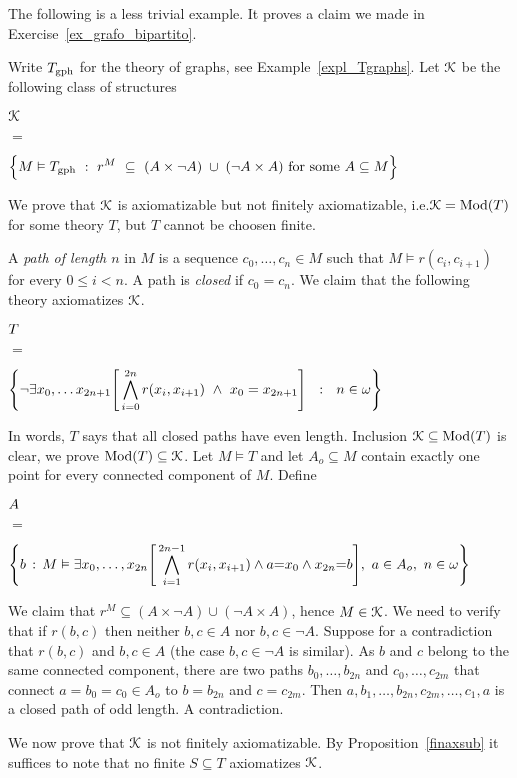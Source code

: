 \documentclass[creche.tex]{subfiles}
\begin{document}
The following is a less trivial example. It proves a claim we made in Exercise~\ref{ex_grafo_bipartito}.

\begin{example}

\def\ceq#1#2#3{\parbox{5ex}{$\displaystyle #1$}\parbox{4ex}{\hfil$#2$}$\displaystyle #3$}

Write $T_{\rm gph}$ for the theory of graphs, see Example~\ref{expl_Tgraphs}. Let $\EuScript K$ be the following class of structures


\ceq{\hfill \K}{=}{\Big\{M\models T_{\rm gph}\ :\ r^M\ \subseteq\ (A\times \neg A)\;\cup\;(\neg A\times A)\textrm{ for some }A\subseteq M\Big\}}


We prove that $\EuScript K$ is axiomatizable but not finitely axiomatizable, i.e.\@ $\EuScript K=\mathop{\rm Mod}(T)$ for some theory $T$, but $T$ cannot be choosen finite.

A \emph{path of length $n$\/} in $M$ is a sequence $c_0,\dots,c_n\in M$ such that $M\models r(c_i,c_{i+1})$ for every $0\le i<n$. A path is \emph{closed\/} if $c_0=c_n$.  We claim that the following theory axiomatizes $\EuScript K$.


\ceq{\hfill T}{=}{\Bigg\{\neg\E x_0,\dots x_{2n+1} \Bigg[\bigwedge^{2n}_{i=0} r(x_i,x_{i+1})\ \wedge\ x_0=x_{2n+1} \Bigg]\ \ :\ \ n\in\omega\Bigg\}}

In words, $T$ says that all closed paths have even length. Inclusion $\EuScript K\subseteq\mathop{\rm Mod}(T)$ is clear, we prove $\mathop{\rm Mod}(T)\subseteq\EuScript K$. Let $M\models T$ and let $A_o\subseteq M$ contain exactly one point for every connected component of $M$. Define 

\ceq{\hfill A}{=}{\Bigg\{b\, :\, M\models\E x_0,\dots, x_{2n} \Bigg[\bigwedge^{2n-1}_{i=1} r(x_i,x_{i+1}) \wedge a{=}x_0\wedge x_{2n}{=}b\Bigg],\ a\in A_o,\ n\in\omega\Bigg\}}

We claim that $r^M\subseteq(A\times \neg A)\cup(\neg A\times A)$, hence $M\in\EuScript K$. We need to verify that if $r(b,c)$ then neither $b,c\in A$ nor $b,c\in\neg A$.  Suppose for a contradiction that $r(b,c)$ and $b,c\in A$ (the case $b,c\in\neg A$ is similar). As $b$ and $c$ belong to the same connected component, there are two paths $b_0,\dots,b_{2n}$ and $c_0,\dots,c_{2m}$ that connect $a=b_0=c_0\in A_o$ to $b=b_{2n}$ and $c=c_{2m}$. Then $a,b_1,\dots,b_{2n},c_{2m},\dots,c_1,a$ is a closed path of odd length. A contradiction.

We now prove that $\EuScript K$ is not finitely axiomatizable. By Proposition~\ref{finaxsub} it suffices to note that no finite $S\subseteq T$ axiomatizes $\EuScript K$.\QED
\end{example}
\end{document}
